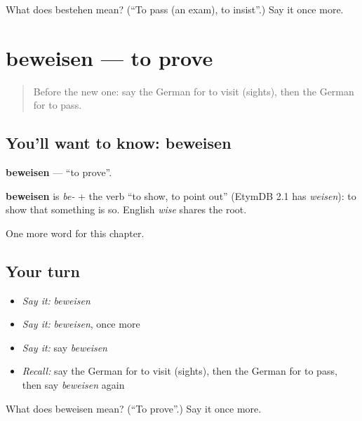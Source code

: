 \begin{tcolorbox}[breakable,colback=teal!4,colframe=teal!35!black,title={Before you move on}]
What does bestehen mean? (\textquotedblleft{}To pass (an exam), to insist\textquotedblright{}.) Say it once more.
\end{tcolorbox}
\section[beweisen]{beweisen — to prove}

\label{lesson:GE-C247-beweisen}



\begin{quote}
Before the new one: say the German for to visit (sights), then the German for to pass.
\end{quote}

\subsection*{You'll want to know: beweisen}
\textbf{beweisen} — \textquotedblleft{}to prove\textquotedblright{}.

\begin{cousinweb}
\textbf{beweisen} is \emph{be-} + the verb \textquotedblleft{}to show, to point out\textquotedblright{} (EtymDB 2.1 has \emph{weisen}): to show that something is so. English \emph{wise} shares the root.
\end{cousinweb}

\begin{grammarlens}[title={What you've built}]
One more word for this chapter.
\end{grammarlens}

\subsection*{Your turn}
\begin{itemize}
\raggedright
  \item \emph{Say it:} \emph{beweisen}
  \item \emph{Say it:} \emph{beweisen}, once more
  \item \emph{Say it:} say \emph{beweisen}
  \item \emph{Recall:} say the German for to visit (sights), then the German for to pass, then say \emph{beweisen} again
\end{itemize}

\begin{tcolorbox}[breakable,colback=teal!4,colframe=teal!35!black,title={Before you move on}]
What does beweisen mean? (\textquotedblleft{}To prove\textquotedblright{}.) Say it once more.
\end{tcolorbox}

